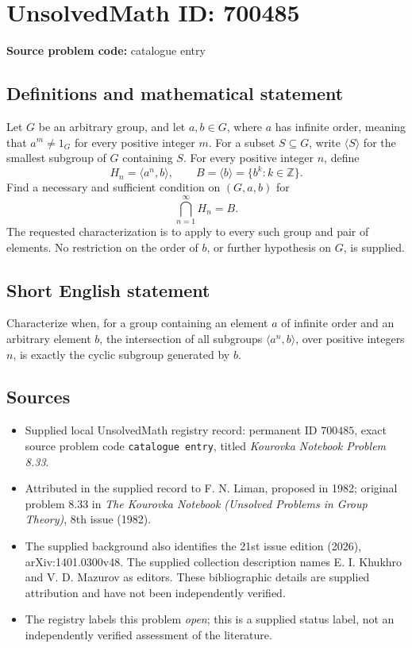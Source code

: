 \documentclass[11pt]{article}
\newcommand{\Z}{\mathbb{Z}}
\begin{document}
\section*{UnsolvedMath ID: 700485}
\textbf{Source problem code:} catalogue entry
\subsection{Definitions and mathematical statement}
Let \(G\) be an arbitrary group, and let \(a,b\in G\), where \(a\) has infinite order, meaning that \(a^m\ne 1_G\) for every positive integer \(m\). For a subset \(S\subseteq G\), write \(\langle S\rangle\) for the smallest subgroup of \(G\) containing \(S\). For every positive integer \(n\), define
\[
H_n=\langle a^n,b\rangle,
\qquad B=\langle b\rangle=\{b^k:k\in\Z\}.
\]
Find a necessary and sufficient condition on \((G,a,b)\) for
\[
\bigcap_{n=1}^{\infty}H_n=B.
\]
The requested characterization is to apply to every such group and pair of elements. No restriction on the order of \(b\), or further hypothesis on \(G\), is supplied.
\subsection{Short English statement}
Characterize when, for a group containing an element \(a\) of infinite order and an arbitrary element \(b\), the intersection of all subgroups \(\langle a^n,b\rangle\), over positive integers \(n\), is exactly the cyclic subgroup generated by \(b\).
\subsection{Sources}
\begin{itemize}
\item Supplied local UnsolvedMath registry record: permanent ID \(700485\), exact source problem code \texttt{catalogue entry}, titled \emph{Kourovka Notebook Problem 8.33}.
\item Attributed in the supplied record to F. N. Liman, proposed in 1982; original problem 8.33 in \emph{The Kourovka Notebook (Unsolved Problems in Group Theory)}, 8th issue (1982).
\item The supplied background also identifies the 21st issue edition (2026), arXiv:1401.0300v48. The supplied collection description names E. I. Khukhro and V. D. Mazurov as editors. These bibliographic details are supplied attribution and have not been independently verified.
\item The registry labels this problem \emph{open}; this is a supplied status label, not an independently verified assessment of the literature.
\end{itemize}
\end{document}
